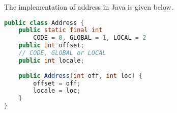 \documentclass[a4paper, openany]{memoir}
\begin{document}
The implementation of address in Java is given below.
\begin{lstlisting}[language=java]
public class Address {
    public static final int 
        CODE = 0, GLOBAL = 1, LOCAL = 2
    public int offset;
    // CODE, GLOBAL or LOCAL
    public int locale; 
    
    public Address(int off, int loc) {
        offset = off; 
        locale = loc;
    }
}
\end{lstlisting}
\end{document}
